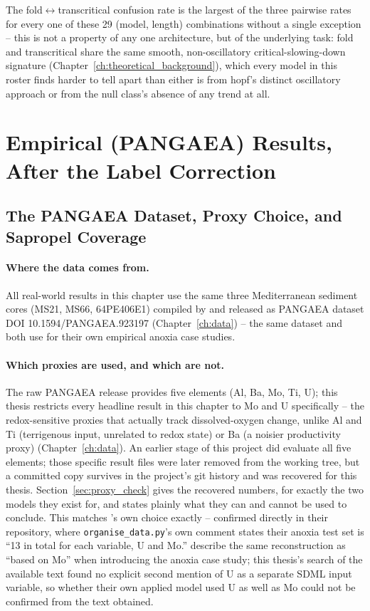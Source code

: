 The fold$\leftrightarrow$transcritical confusion rate is the largest of the three pairwise rates for every one of these 29 (model, length) combinations without a single exception -- this is not a property of any one architecture, but of the underlying task: fold and transcritical share the same smooth, non-oscillatory critical-slowing-down signature (Chapter~\ref{ch:theoretical_background}), which every model in this roster finds harder to tell apart than either is from hopf's distinct oscillatory approach or from the null class's absence of any trend at all.

\section{Empirical (PANGAEA) Results, After the Label Correction}
\label{sec:pangaea_results}

\subsection{The PANGAEA Dataset, Proxy Choice, and Sapropel Coverage}
\label{sec:pangaea_provenance}

\paragraph{Where the data comes from.} All real-world results in this chapter use the same three Mediterranean sediment cores (MS21, MS66, 64PE406E1) compiled by \citet{hennekam2020} and released as PANGAEA dataset DOI 10.1594/PANGAEA.923197 (Chapter~\ref{ch:data}) -- the same dataset \citet{bury2021} and \citet{ma2025sdml} both use for their own empirical anoxia case studies.

\paragraph{Which proxies are used, and which are not.} The raw PANGAEA release provides five elements (Al, Ba, Mo, Ti, U); this thesis restricts every headline result in this chapter to Mo and U specifically -- the redox-sensitive proxies that actually track dissolved-oxygen change, unlike Al and Ti (terrigenous input, unrelated to redox state) or Ba (a noisier productivity proxy) (Chapter~\ref{ch:data}). An earlier stage of this project did evaluate all five elements; those specific result files were later removed from the working tree, but a committed copy survives in the project's git history and was recovered for this thesis. Section~\ref{sec:proxy_check} gives the recovered numbers, for exactly the two models they exist for, and states plainly what they can and cannot be used to conclude. This matches \citet{bury2021}'s own choice exactly -- confirmed directly in their repository, where \texttt{organise\_data.py}'s own comment states their anoxia test set is ``13 in total for each variable, U and Mo.'' \citet{ma2025sdml} describe the same \citet{hennekam2020} reconstruction as ``based on Mo'' when introducing the anoxia case study; this thesis's search of the available text found no explicit second mention of U as a separate SDML input variable, so whether their own applied model used U as well as Mo could not be confirmed from the text obtained.

